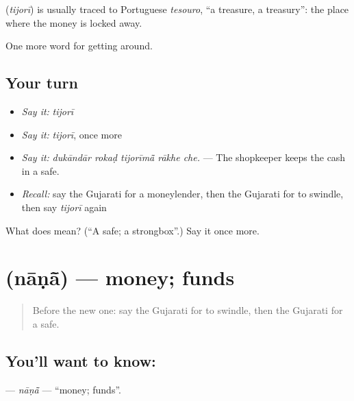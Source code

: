 \begin{cousinweb}
\textbf{} (\emph{tijorī}) is usually traced to Portuguese \emph{tesouro}, \textquotedblleft{}a treasure, a treasury\textquotedblright{}: the place where the money is locked away.
\end{cousinweb}

\begin{grammarlens}[title={What you've built}]
One more word for getting around.
\end{grammarlens}

\subsection*{Your turn}
\begin{itemize}
\raggedright
  \item \emph{Say it:} \emph{tijorī}
  \item \emph{Say it:} \emph{tijorī}, once more
  \item \emph{Say it:} \emph{dukāndār rokaḍ tijorīmā̃ rākhe che.} — The shopkeeper keeps the cash in a safe.
  \item \emph{Recall:} say the Gujarati for a moneylender, then the Gujarati for to swindle, then say \emph{tijorī} again
\end{itemize}

\begin{tcolorbox}[breakable,colback=teal!4,colframe=teal!35!black,title={Before you move on}]
What does  mean? (\textquotedblleft{}A safe; a strongbox\textquotedblright{}.) Say it once more.
\end{tcolorbox}
\section[\texorpdfstring{\gu{નાણાં} (nāṇā̃)}{નાણાં (nāṇā̃)}]{ (nāṇā̃) — money; funds}

\label{lesson:GU-C429-nana}



\begin{quote}
Before the new one: say the Gujarati for to swindle, then the Gujarati for a safe.
\end{quote}

\subsection*{You'll want to know: }
\textbf{} — \emph{nāṇā̃} — \textquotedblleft{}money; funds\textquotedblright{}.

